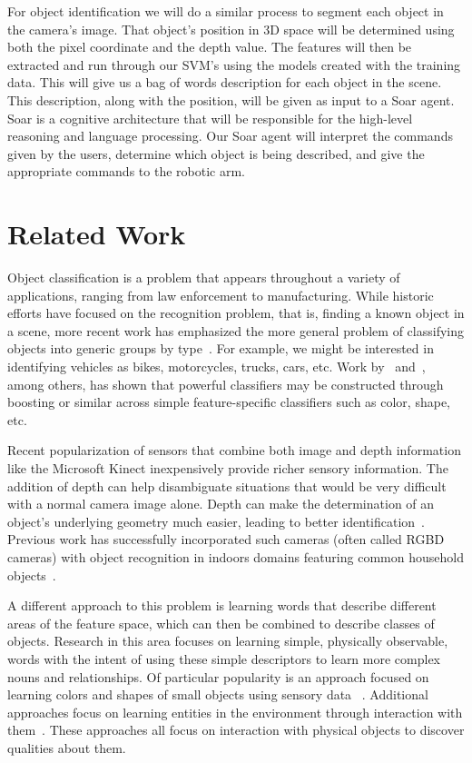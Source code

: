 \documentclass[11pt]{article}
\newcommand{\xxx}[1]{{\bf \color{red} #1}}
\begin{document}
For object identification we will do a similar process to segment each object in the camera's image. That object's position in 3D space will be determined using both the pixel coordinate and the depth value. The features will then be extracted and run through our SVM's using the models created with the training data. This will give us a bag of words description for each object in the scene. This description, along with the position, will be given as input to a Soar agent. Soar is a cognitive architecture that will be responsible for the high-level reasoning and language processing. Our Soar agent will interpret the commands given by the users, determine which object is being described, and give the appropriate commands to the robotic arm.


\section{Related Work}

Object classification is a problem that appears throughout a variety of
applications, ranging from law enforcement to manufacturing. While historic
efforts have focused on the recognition problem, that is, finding a known object
in a scene, more recent work has emphasized the more general problem of
classifying objects into generic groups by type~\cite{huber2004parts}. For example,
we might be interested in identifying vehicles as bikes, motorcycles, trucks,
cars, etc. Work by~\cite{nilsback2006visual} and~\cite{gehler2009feature}, among
others, has shown that powerful classifiers may be constructed through boosting
or similar across simple feature-specific classifiers such as color, shape, etc.

Recent popularization of sensors that combine both image and depth information
like the Microsoft Kinect inexpensively provide richer sensory information. The
addition of depth can help disambiguate situations that would be very difficult
with a normal camera image alone. Depth can make the determination of an object’s
underlying geometry much easier, leading to better identification~\cite{marton2010hierarchical}.
Previous work has successfully incorporated such cameras (often called RGBD
cameras) with object recognition in indoors domains featuring common household
objects~\cite{marton2010hierarchical, lai2011sparse}.

A different approach to this problem is learning words that describe different
areas of the feature space, which can then be combined to describe classes of
objects. Research in this area focuses on learning simple, physically observable,
words with the intent of using these simple descriptors to learn more complex
nouns and relationships. Of particular popularity is an approach focused on
learning colors and shapes of small objects using sensory data
~\cite{zambuto2010visually, roy2002learning}. Additional approaches focus on learning entities in the
environment through interaction with them~\cite{gold2009robotic}. These approaches
all focus on interaction with physical objects to discover qualities about them.
\end{document}
